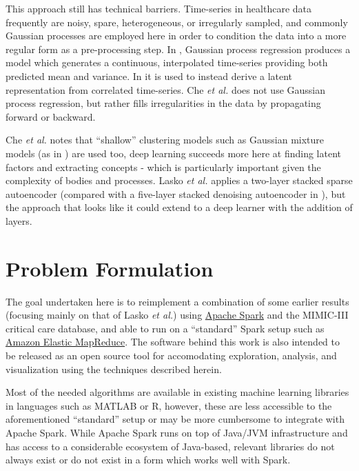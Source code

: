 \documentclass[journal]{IEEEtran}
\begin{document}
This approach still has technical barriers.  Time-series in healthcare
data frequently are noisy, spare, heterogeneous, or irregularly
sampled, and commonly Gaussian processes are employed here in order to
condition the data into a more regular form as a pre-processing step.
In \cite{Lasko2013}, Gaussian process regression produces a model
which generates a continuous, interpolated time-series providing both
predicted mean and variance.  In \cite{Ghassemi2015} it is used to
instead derive a latent representation from correlated time-series.
Che \emph{et al.}\cite{Che2015} does not use Gaussian process
regression, but rather fills irregularities in the data by propagating
forward or backward.

Che \emph{et al.}\cite{Che2015} notes that ``shallow'' clustering
models such as Gaussian mixture models (as in \cite{Marlin}) are used
too, deep learning succeeds more here at finding latent factors and
extracting concepts - which is particularly important given the
complexity of bodies and processes.  Lasko \emph{et
  al.}\cite{Lasko2013} applies a two-layer stacked sparse autoencoder
(compared with a five-layer stacked denoising autoencoder in
\cite{Che2015}), but the approach that looks like it could extend to a
deep learner with the addition of layers.

\section{Problem Formulation}

The goal undertaken here is to reimplement a combination of some
earlier results (focusing mainly on that of Lasko \emph{et
  al.}\cite{Lasko2013}) using \href{http://spark.apache.org/}{Apache
  Spark} and the MIMIC-III critical care database\cite{Johnson2016a},
and able to run on a ``standard'' Spark setup such as
\href{https://aws.amazon.com/emr/}{Amazon Elastic MapReduce}. The
software behind this work is also intended to be released as an open
source tool for accomodating exploration, analysis, and visualization
using the techniques described herein.

Most of the needed algorithms are available in existing machine
learning libraries in languages such as MATLAB or R, however, these
are less accessible to the aforementioned ``standard'' setup or may be
more cumbersome to integrate with Apache Spark.  While Apache Spark
runs on top of Java/JVM infrastructure and has access to a
considerable ecosystem of Java-based, relevant libraries do not always
exist or do not exist in a form which works well with Spark.
\end{document}
